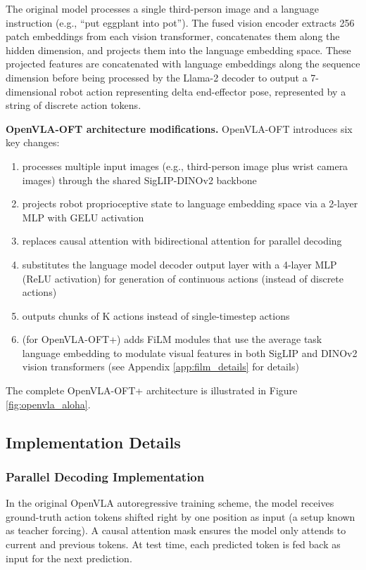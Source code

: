 \documentclass[conference]{IEEEtran}
\begin{document}
The original model processes a single third-person image and a language instruction (e.g., ``put eggplant into pot''). The fused vision encoder extracts 256 patch embeddings from each vision transformer, concatenates them along the hidden dimension, and projects them into the language embedding space. These projected features are concatenated with language embeddings along the sequence dimension before being processed by the Llama-2 decoder to output a 7-dimensional robot action representing delta end-effector pose, represented by a string of discrete action tokens.

\textbf{OpenVLA-OFT architecture modifications.} OpenVLA-OFT introduces six key changes:
\begin{enumerate}
    \item processes multiple input images (e.g., third-person image plus wrist camera images) through the shared SigLIP-DINOv2 backbone
    \item projects robot proprioceptive state to language embedding space via a 2-layer MLP with GELU activation
    \item replaces causal attention with bidirectional attention for parallel decoding
    \item substitutes the language model decoder output layer with a 4-layer MLP (ReLU activation) for generation of continuous actions (instead of discrete actions)
    \item outputs chunks of K actions instead of single-timestep actions
    \item (for OpenVLA-OFT+) adds FiLM \citep{perez2018film} modules that use the average task language embedding to modulate visual features in both SigLIP and DINOv2 vision transformers (see Appendix \ref{app:film_details} for details)
\end{enumerate}

The complete OpenVLA-OFT+ architecture is illustrated in Figure \ref{fig:openvla_aloha}.







\subsection{Implementation Details}
\label{app:implementation_details}

\subsubsection{Parallel Decoding Implementation}
In the original OpenVLA autoregressive training scheme, the model receives ground-truth action tokens shifted right by one position as input (a setup known as teacher forcing). A causal attention mask ensures the model only attends to current and previous tokens. At test time, each predicted token is fed back as input for the next prediction.
\end{document}
